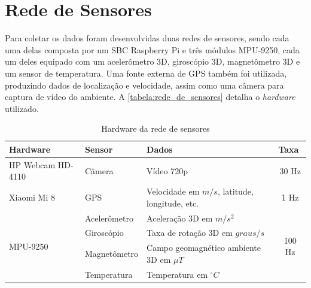 \section{Rede de Sensores}

Para coletar os dados foram desenvolvidas duas redes de sensores, sendo cada uma delas composta por um SBC Raspberry Pi e três módulos MPU-9250, cada um deles equipado com um acelerômetro 3D, giroscópio 3D, magnetômetro 3D e um sensor de temperatura. Uma fonte externa de GPS também foi utilizada, produzindo dados de localização e velocidade, assim como uma câmera para captura de vídeo do ambiente. A \autoref{tabela:rede_de_sensores} detalha o \textit{hardware} utilizado.

\begin{table}[h!]
\small
\caption{Hardware da rede de sensores} 
\label{tabela:rede_de_sensores}
\centering
\begin{tabular}{llll}
\toprule
\multicolumn{1}{l}{\textbf{Hardware}} & 
\multicolumn{1}{l}{\textbf{Sensor}} & 
\multicolumn{1}{l}{\textbf{Dados}} & 
\multicolumn{1}{l}{\textbf{Taxa}}  
\\ \midrule

\multicolumn{1}{l}{HP Webcam HD-4110} & 
\multicolumn{1}{l}{Câmera} & 
\multicolumn{1}{l}{Vídeo 720p} & 
\multicolumn{1}{c}{30 Hz}                   
\\ \midrule

\multicolumn{1}{l}{Xiaomi Mi 8} & 
\multicolumn{1}{l}{GPS} & 
\multicolumn{1}{l}{Velocidade em $m/s$, latitude, longitude, etc.} &
\multicolumn{1}{c}{1 Hz}
\\ \midrule

\multicolumn{1}{l}{\multirow{5}{*}{MPU-9250}} & 
\multicolumn{1}{l}{Acelerômetro} & 
\multicolumn{1}{l}{Aceleração 3D em $m/s^2$} &
\multicolumn{1}{c}{\multirow{5}{*}{100 Hz}} 
\\ \cmidrule(lr){2-3}

\multicolumn{1}{l}{} & 
\multicolumn{1}{l}{Giroscópio} & 
\multicolumn{1}{l}{Taxa de rotação 3D em $graus/s$} & 
\multicolumn{1}{l}{}                       
\\ \cmidrule(lr){2-3}

\multicolumn{1}{l}{} & 
\multicolumn{1}{l}{Magnetômetro} & 
\multicolumn{1}{l}{Campo geomagnético ambiente 3D em $\mu T$} & 
\multicolumn{1}{l}{}
\\ \cmidrule(lr){2-3}

\multicolumn{1}{l}{} & 
\multicolumn{1}{l}{Temperatura} &
\multicolumn{1}{l}{Temperatura em $^{\circ}C$} & 
\multicolumn{1}{l}{}                       
\\ \bottomrule

\end{tabular}
\end{table}

